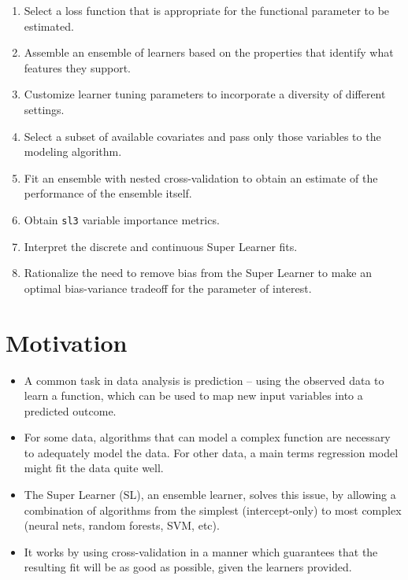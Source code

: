 \documentclass[12pt, krantz2,]{book}
\providecommand{\tightlist}{%
  \setlength{\itemsep}{0pt}\setlength{\parskip}{0pt}}
\theoremstyle{definition}
\theoremstyle{definition}
\theoremstyle{definition}
\newcommand{\1}{\mathbbm{1}}
\begin{document}
\begin{enumerate}
\def\labelenumi{\arabic{enumi}.}
\tightlist
\item
  Select a loss function that is appropriate for the functional parameter to
  be estimated.
\item
  Assemble an ensemble of learners based on the properties that identify what
  features they support.
\item
  Customize learner tuning parameters to incorporate a diversity of different
  settings.
\item
  Select a subset of available covariates and pass only those variables to the
  modeling algorithm.
\item
  Fit an ensemble with nested cross-validation to obtain an estimate of the
  performance of the ensemble itself.
\item
  Obtain \texttt{sl3} variable importance metrics.
\item
  Interpret the discrete and continuous Super Learner fits.
\item
  Rationalize the need to remove bias from the Super Learner to make an
  optimal bias-variance tradeoff for the parameter of interest.
\end{enumerate}

\hypertarget{motivation}{%
\section*{Motivation}\label{motivation}}


\begin{itemize}
\tightlist
\item
  A common task in data analysis is prediction -- using the observed data to
  learn a function, which can be used to map new input variables into a
  predicted outcome.
\item
  For some data, algorithms that can model a complex function are necessary to
  adequately model the data. For other data, a main terms regression model might
  fit the data quite well.
\item
  The Super Learner (SL), an ensemble learner, solves this issue, by allowing a
  combination of algorithms from the simplest (intercept-only) to most complex
  (neural nets, random forests, SVM, etc).
\item
  It works by using cross-validation in a manner which guarantees that the
  resulting fit will be as good as possible, given the learners provided.
\end{itemize}
\end{document}
